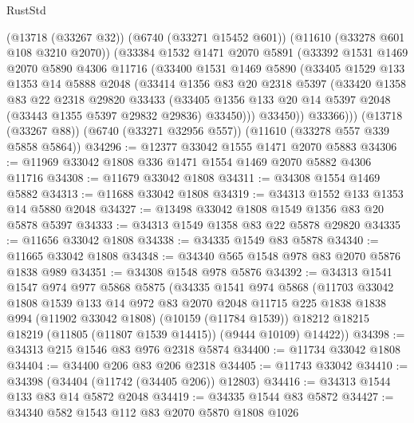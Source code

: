 \begin{lexlean}{RustStd}
\begin{coremodule}
      (@13718 (@33267 @32))
      (@6740 (@33271 @15452 @601))
      (@11610 (@33278 @601 @108 @3210 @2070))
      (@33384
        @1532
        @1471
        @2070
        @5891
        (@33392
          @1531
          @1469
          @2070
          @5890
          @4306
          @11716
          (@33400
            @1531
            @1469
            @5890
            (@33405
              @1529
              @133
              @1353
              @14
              @5888
              @2048
              (@33414
                @1356
                @83
                @20
                @2318
                @5397
                (@33420
                  @1358
                  @83
                  @22
                  @2318
                  @29820
                  @33433
                  (@33405
                    @1356
                    @133
                    @20
                    @14
                    @5397
                    @2048
                    (@33443 @1355 @5397 @29832 @29836)
                    @33450)))
              @33450))
          @33366)))
    (@13718 (@33267 @88))
    (@6740 (@33271 @32956 @557))
    (@11610 (@33278 @557 @339 @5858 @5864))
@34296 := @12377 @33042 @1555 @1471 @2070 @5883
@34306 := @11969 @33042 @1808 @336 @1471 @1554 @1469 @2070 @5882 @4306 @11716
@34308 := @11679 @33042 @1808
@34311 := @34308 @1554 @1469 @5882
@34313 := @11688 @33042 @1808
@34319 := @34313 @1552 @133 @1353 @14 @5880 @2048
@34327 := @13498 @33042 @1808 @1549 @1356 @83 @20 @5878 @5397
@34333 := @34313 @1549 @1358 @83 @22 @5878 @29820
@34335 := @11656 @33042 @1808
@34338 := @34335 @1549 @83 @5878
@34340 := @11665 @33042 @1808
@34348 := @34340 @565 @1548 @978 @83 @2070 @5876 @1838 @989
@34351 := @34308 @1548 @978 @5876
@34392 := @34313
    @1541
    @1547
    @974
    @977
    @5868
    @5875
    (@34335
      @1541
      @974
      @5868
      (@11703
        @33042
        @1808
        @1539
        @133
        @14
        @972
        @83
        @2070
        @2048
        @11715
        @225
        @1838
        @1838
        @994
        (@11902 @33042 @1808)
        (@10159 (@11784 @1539))
        @18212
        @18215
        @18219
        (@11805 (@11807 @1539 @14415))
        (@9444 @10109)
        @14422))
@34398 := @34313 @215 @1546 @83 @976 @2318 @5874
@34400 := @11734 @33042 @1808
@34404 := @34400 @206 @83 @206 @2318
@34405 := @11743 @33042
@34410 := @34398 (@34404 (@11742 (@34405 @206)) @12803)
@34416 := @34313 @1544 @133 @83 @14 @5872 @2048
@34419 := @34335 @1544 @83 @5872
@34427 := @34340 @582 @1543 @112 @83 @2070 @5870 @1808 @1026

\end{coremodule}
\end{lexlean}
